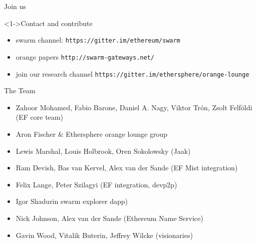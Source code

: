 \begin{frame}[plain]{Join us}

\begin{block}<1->{Contact and contribute}
\begin{itemize}
\item swarm channel: \texttt{https://gitter.im/ethereum/swarm}
\item orange papers \texttt{http://swarm-gateways.net/}
\item join our research channel \texttt{https://gitter.im/ethersphere/orange-lounge}
\end{itemize}
\end{block}
\begin{block}{The Team}
\begin{itemize}
\footnotesize
\item Zahoor Mohamed, Fabio Barone, Daniel A. Nagy, Viktor Trón, Zsolt Felföldi (EF core team)
\item Aron Fischer \& Ethersphere orange lounge group
\item Lewis Marshal, Louis Holbrook, Oren Sokolowsky (Jaak)
\item Ram Devish, Bas van Kervel, Alex van der Sande (EF Mist integration)
\item Felix Lange, Peter Szilagyi (EF integration, devp2p)
\item Igor Shadurin swarm explorer dapp)
\item Nick Johnson, Alex van der Sande (Ethereum Name Service)
\item Gavin Wood, Vitalik Buterin, Jeffrey Wilcke (visionaries)
\end{itemize}
\end{block}

\end{frame}

